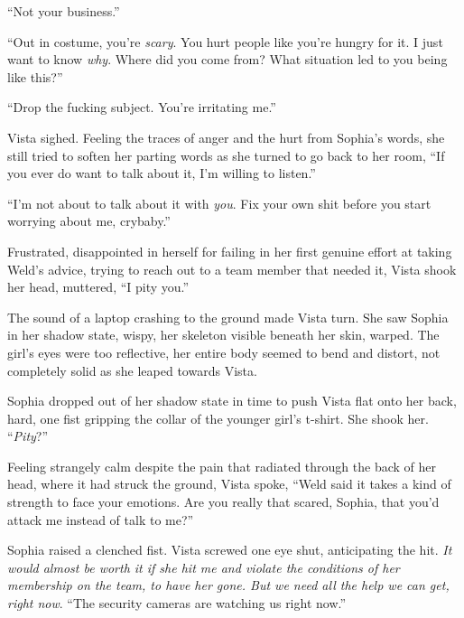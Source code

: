 ``Not your business.''



``Out in costume, you're \emph{scary}.  You hurt people like you're hungry for it.  I just want to know \emph{why}.  Where did you come from?  What situation led to you being like this?''



``Drop the fucking subject.  You're irritating me.''



Vista sighed.  Feeling the traces of anger and the hurt from Sophia's words, she still tried to soften her parting words as she turned to go back to her room, ``If you ever do want to talk about it, I'm willing to listen.''



``I'm not about to talk about it with \emph{you}.  Fix your own shit before you start worrying about me, crybaby.''



Frustrated, disappointed in herself for failing in her first genuine effort at taking Weld's advice, trying to reach out to a team member that needed it, Vista shook her head, muttered, ``I pity you.''



The sound of a laptop crashing to the ground made Vista turn.  She saw Sophia in her shadow state, wispy, her skeleton visible beneath her skin, warped.  The girl's eyes were too reflective, her entire body seemed to bend and distort, not completely solid as she leaped towards Vista.



Sophia dropped out of her shadow state in time to push Vista flat onto her back, hard, one fist gripping the collar of the younger girl's t-shirt.  She shook her.  ``\emph{Pity}?''



Feeling strangely calm despite the pain that radiated through the back of her head, where it had struck the ground, Vista spoke, ``Weld said it takes a kind of strength to face your emotions.  Are you really that scared, Sophia, that you'd attack me instead of talk to me?''



Sophia raised a clenched fist.  Vista screwed one eye shut, anticipating the hit.  \emph{It would almost be worth it if she hit me and violate the conditions of her membership on the team, to have her gone.  But we need all the help we can get, right now}.  ``The security cameras are watching us right now.''



